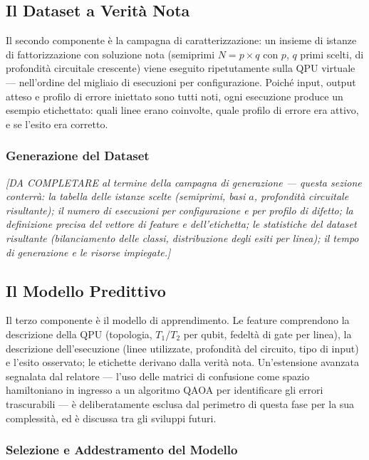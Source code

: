 \begin{onehalfspace}
\subsection{Il Dataset a Verità Nota}
\label{subsec:dataset_verita}

Il secondo componente è la campagna di caratterizzazione: un insieme di istanze di fattorizzazione con soluzione nota (semiprimi $N = p \times q$ con $p$, $q$ primi scelti, di profondità circuitale crescente) viene eseguito ripetutamente sulla QPU virtuale --- nell'ordine del migliaio di esecuzioni per configurazione. Poiché input, output atteso e profilo di errore iniettato sono tutti noti, ogni esecuzione produce un esempio etichettato: quali linee erano coinvolte, quale profilo di errore era attivo, e se l'esito era corretto.

\subsubsection{Generazione del Dataset}
\label{subsec:impl_dataset}

\textit{[DA COMPLETARE al termine della campagna di generazione --- questa sezione conterrà: la tabella delle istanze scelte (semiprimi, basi $a$, profondità circuitale risultante); il numero di esecuzioni per configurazione e per profilo di difetto; la definizione precisa del vettore di feature e dell'etichetta; le statistiche del dataset risultante (bilanciamento delle classi, distribuzione degli esiti per linea); il tempo di generazione e le risorse impiegate.]}

\subsection{Il Modello Predittivo}
\label{subsec:modello_predittivo}

Il terzo componente è il modello di apprendimento. Le feature comprendono la descrizione della QPU (topologia, $T_1$/$T_2$ per qubit, fedeltà di gate per linea), la descrizione dell'esecuzione (linee utilizzate, profondità del circuito, tipo di input) e l'esito osservato; le etichette derivano dalla verità nota. Un'estensione avanzata segnalata dal relatore --- l'uso delle matrici di confusione come spazio hamiltoniano in ingresso a un algoritmo \ac{QAOA} per identificare gli errori trascurabili --- è deliberatamente esclusa dal perimetro di questa fase per la sua complessità, ed è discussa tra gli sviluppi futuri.

\subsubsection{Selezione e Addestramento del Modello}
\label{subsec:impl_modello}


\end{onehalfspace}
